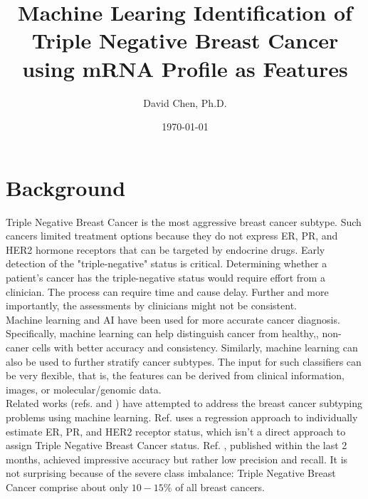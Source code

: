 \documentclass[11pt]{diazessay}
\title{\Large \textbf{Machine Learing Identification of Triple Negative Breast Cancer using mRNA Profile as Features}}
\author{David Chen, Ph.D.}
\date{\today}
\begin{document}
\maketitle



\section{Background}

Triple Negative Breast Cancer is the most aggressive breast cancer subtype. Such cancers limited treatment options because they do not express ER, PR, and HER2 hormone receptors that can be targeted by endocrine drugs. Early detection of the "triple-negative" status is critical. Determining whether a patient's cancer has the triple-negative status would require effort from a clinician. The process can require time and cause delay. Further and more importantly, the assessments by clinicians might not be consistent. \\

Machine learning and AI have been used for more accurate cancer diagnosis. Specifically, machine learning can help distinguish cancer from healthy,, non-caner cells with better accuracy and consistency. Similarly, machine learning can also be used to further stratify cancer subtypes. The input for such classifiers can be very flexible, that is, the features can be derived from clinical information, images, or molecular/genomic data. \\

Related works (refs.\cite{lehmann2011} and \cite{wu2021}) have attempted to address the breast cancer subtyping problems using machine learning. Ref.\cite{lehmann2011} uses a regression approach to individually estimate ER, PR, and HER2 receptor status, which isn't a direct approach to assign Triple Negative Breast Cancer status. Ref. \cite{wu2021}, published within the last 2 months, achieved impressive accuracy but rather low precision and recall. It is not surprising because of the severe class imbalance: Triple Negative Breast Cancer comprise about only $10-15\%$ of all breast cancers. \\
\end{document}
